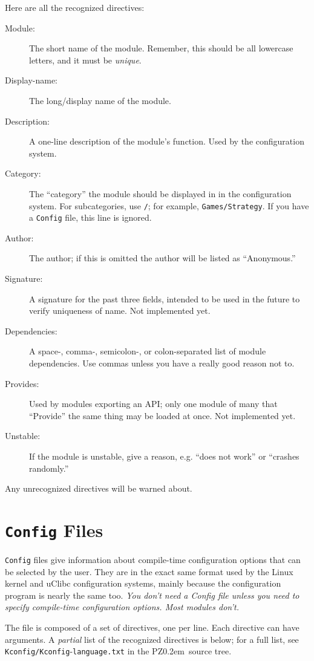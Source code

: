 \documentclass[12pt,letterpaper]{report}
\def\pz{{\footnotesize PZ}}
\def\pzt{\pz\kern0.2em{\large\oldstyle2}}
\let\ttt\tt
\def\tt{\def\_{{\ttt\char`\_}}\ttt}
\def\texttt#1{{\tt #1}}
\begin{document}
Here are all the recognized directives:
\begin{description}
\item[Module:] The short name of the module. Remember, this should be all lowercase letters, and
it must be {\it unique}.
\item[Display-name:] The long/display name of the module.
\item[Description:] A one-line description of the module's function. Used by the configuration
system.
\item[Category:] The ``category'' the module should be displayed in in the configuration system.
For subcategories, use \verb|/|; for example, \verb|Games/Strategy|. If you have a \verb|Config|
file, this line is ignored.
\item[Author:] The author; if this is omitted the author will be listed as ``Anonymous.''
\item[Signature:] A signature for the past three fields, intended to be used in the future to verify
uniqueness of name. Not implemented yet.
\item[Dependencies:] A space-, comma-, semicolon-, or colon-separated list of module dependencies.
Use commas unless you have a really good reason not to.
\item[Provides:] Used by modules exporting an API; only one module of many that ``Provide'' the same thing
may be loaded at once. Not implemented yet.
\item[Unstable:] If the module is unstable, give a reason, e.g. ``does not work'' or ``crashes
randomly.''
\end{description}
Any unrecognized directives will be warned about.

\section{\texttt{Config} Files}
\verb|Config| files give information about compile-time configuration options that
can be selected by the user. They are in the exact same format used by the Linux kernel
and uClibc configuration systems, mainly because the configuration program is nearly the
same too. {\it You don't need a Config file unless you need to specify compile-time configuration options.
Most modules don't.}

The file is composed of a set of directives, one per line. Each directive can have arguments.
A {\it partial} list of the recognized directives is below; for a full list, see
\verb|Kconfig/|\discretionary{}{}{}\verb|Kconfig|-\discretionary{}{}{}\verb|language.txt| in
the \pzt\ source tree.
\end{document}
